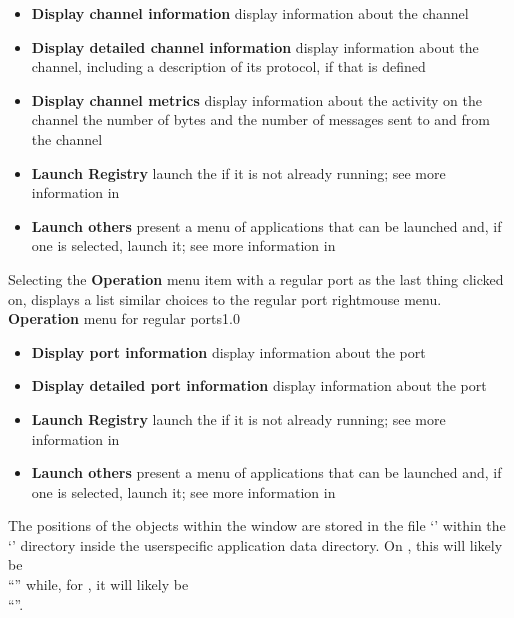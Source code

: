 \begin{itemize}
\item\textbf{Display channel information} display information about the channel
\item\exSp\textbf{Display detailed channel information} display information about the
channel, including a description of its protocol, if that is defined
\item\exSp\textbf{Display channel metrics} display information about the activity on the
channel \longDash{} the number of bytes and the number of messages sent to and from the
channel
\item\exSp\textbf{Launch Registry} launch the \emph{\RS} if it is not already running; see
more information in\\
\item\exSp\textbf{Launch others \textellipsis} present a menu of applications that can be
launched and, if one is selected, launch it; see more information in
\end{itemize}
\condPage{}
Selecting the \textbf{Operation} menu item with a regular port as the last thing clicked on,
displays a list similar choices to the regular port right\longDash{}mouse menu.\\
%
{\textbf{Operation} menu for regular ports}{1.0}
\begin{itemize}
\item\textbf{Display port information} display information about the port
\item\exSp\textbf{Display detailed port information} display information about the port
\item\exSp\textbf{Launch Registry} launch the \emph{\RS} if it is not already running; see
more information in\\
\item\exSp\textbf{Launch others \textellipsis} present a menu of applications that can be
launched and, if one is selected, launch it; see more information in
\end{itemize}
\condPage{}
The positions of the objects within the window are stored in the file
`' within the `' directory inside the
user\longDash{}specific application data directory.
On \win, this will likely be\\
``'' while, for \mac, it will likely be\\
``''.\\
\primaryEnd{}
